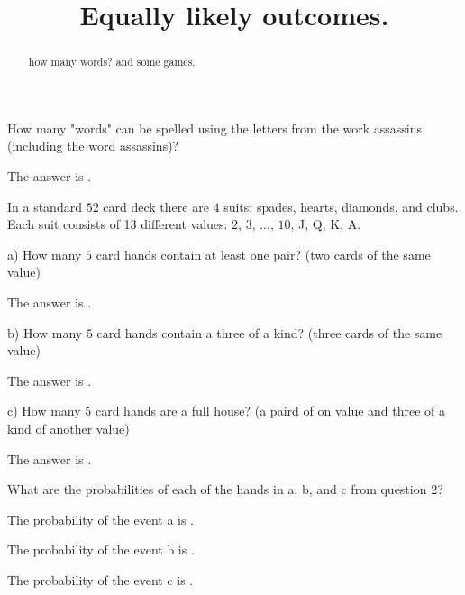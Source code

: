 \documentclass{ximera}
\title{Equally likely outcomes.}
\begin{document}
\begin{abstract}
how many words? and some games.
\end{abstract}
\maketitle

\begin{question}
How many "words" can be spelled using the letters from the work assassins (including the word assassins)?
     \begin{solution}
           The answer is .
     \end{solution}
\end{question}

\begin{question}
In a standard $52$ card deck there are $4$ suits:  spades, hearts, diamonds, and clubs.  Each suit consists of 13 different values:  $2$, $3$, ..., $10$, J, Q, K, A. 

a)  How many $5$ card hands contain at least one pair?  (two cards of the same value)
     \begin{solution}
           The answer is .
     \end{solution}
     
b)  How many $5$ card hands contain a three of a kind?  (three cards of the same value)
     \begin{solution}
           The answer is .
     \end{solution}
     
c)  How many $5$ card hands are a full house?  (a paird of on value and three of a kind of another value)
     \begin{solution}
           The answer is .
     \end{solution}
\end{question}

\begin{question}
What are the probabilities of each of the hands in a, b, and c from question 2?
     \begin{solution}
           The probability of the event a is .
     \end{solution}
      \begin{solution}
           The probability of the event b is .
     \end{solution}
      \begin{solution}
           The probability of the event c is .
     \end{solution}
\end{question}
\end{document}
